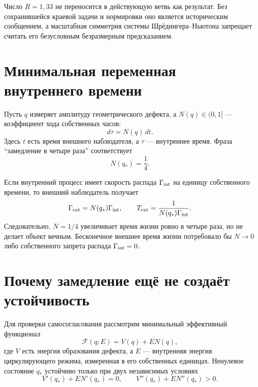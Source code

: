 \begin{nogocriterion}
Число $R=1{,}33$ не переносится в действующую ветвь как результат. Без
сохранившейся краевой задачи и нормировки оно является историческим
сообщением, а масштабная симметрия системы Шрёдингера--Ньютона запрещает
считать его безусловным безразмерным предсказанием.
\end{nogocriterion}

\section{Минимальная переменная внутреннего времени}

Пусть $q$ измеряет амплитуду геометрического дефекта, а
$N(q)\in(0,1]$ --- коэффициент хода собственных часов:
\begin{equation}
 d\tau=N(q)\,dt.
 \label{eq:v5-lapse-definition}
\end{equation}
Здесь $t$ есть время внешнего наблюдателя, а $\tau$ --- внутреннее время.
Фраза ``замедление в четыре раза'' соответствует
\begin{equation}
 N(q_*)=\frac14.
 \label{eq:v5-quarter-lapse}
\end{equation}

Если внутренний процесс имеет скорость распада $\Gamma_{\rm int}$ на
единицу собственного времени, то внешний наблюдатель получает
\begin{equation}
 \Gamma_{\rm ext}=N(q_*)\Gamma_{\rm int},\qquad
 T_{\rm ext}=\frac{1}{N(q_*)\Gamma_{\rm int}}.
 \label{eq:v5-external-lifetime}
\end{equation}
Следовательно, $N=1/4$ увеличивает время жизни ровно в четыре раза, но не
делает объект вечным. Бесконечное внешнее время жизни потребовало бы
$N\to0$ либо собственного запрета распада $\Gamma_{\rm int}=0$.

\section{Почему замедление ещё не создаёт устойчивость}

Для проверки самосогласования рассмотрим минимальный эффективный
функционал
\begin{equation}
 \mathcal F(q;E)=V(q)+E N(q),
 \label{eq:v5-time-well-functional}
\end{equation}
где $V$ есть энергия образования дефекта, а $E$ --- внутренняя энергия
циркулирующего режима, измеренная в его собственных единицах. Ненулевое
состояние $q_*$ устойчиво только при двух независимых условиях
\begin{equation}
 V'(q_*)+E N'(q_*)=0,
 \qquad
 V''(q_*)+E N''(q_*)>0.
 \label{eq:v5-time-well-stability}
\end{equation}

